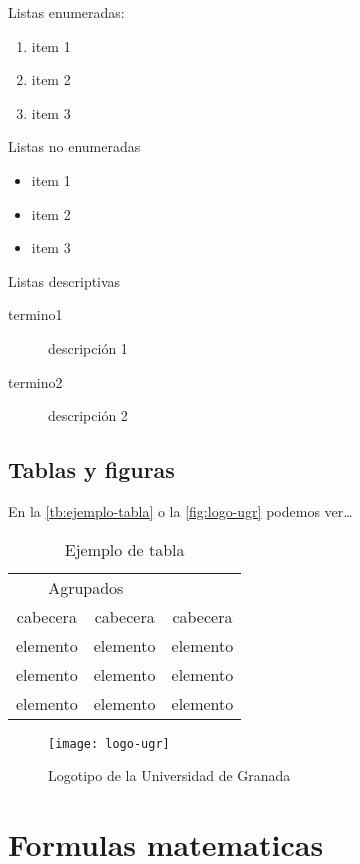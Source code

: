 Listas enumeradas:
\begin{enumerate}
  \item item 1
  \item item 2
  \item item 3
\end{enumerate}

Listas no enumeradas
\begin{itemize}
  \item item 1
  \item item 2
  \item item 3
  \end{itemize}

Listas descriptivas
\begin{description}
  \item[termino1] descripción 1
  \item[termino2] descripción 2
\end{description}
  
\subsection{Tablas y figuras}

En la \autoref{tb:ejemplo-tabla} o la \autoref{fig:logo-ugr} podemos ver\ldots

\begin{table}[htpb]
  \centering
  \begin{tabular}{ccc} \toprule
    \multicolumn{2}{c}{Agrupados} \\ \cmidrule(r){1-2}
    cabecera & cabecera & cabecera          \\ \midrule
    elemento & elemento & elemento          \\ 
    elemento & elemento & elemento          \\ 
    elemento & elemento & elemento          \\ \bottomrule
  \end{tabular}
  \caption{Ejemplo de tabla}
  \label{tb:ejemplo-tabla}
\end{table}

\begin{figure}[htpb]
  \centering
  \texttt{[image: logo-ugr]}
  \caption{Logotipo de la Universidad de Granada}
  \label{fig:logo-ugr}
\end{figure}

\section{Formulas matematicas}\label{sec:functores}

